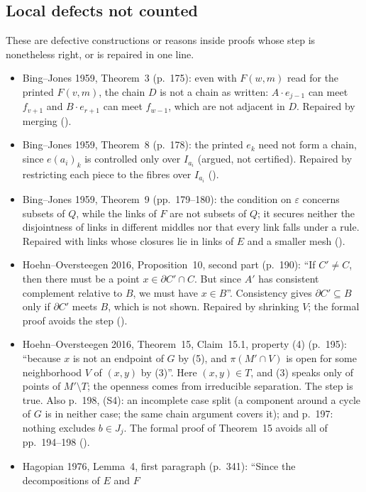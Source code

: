 \documentclass[11pt]{article}
\newcounter{defect}
\begin{document}
\subsection*{Local defects not counted}
These are defective constructions or reasons inside proofs whose step is nonetheless right, or is
repaired in one line.
\begin{itemize}
\item Bing--Jones 1959, Theorem~3 (p.~175): even with $F(w,m)$ read for the printed $F(v,m)$, the
  chain $D$ is not a chain as written: $A\cdot e_{j-1}$ can meet $f_{v+1}$ and $B\cdot e_{r+1}$ can
  meet $f_{w-1}$, which are not adjacent in $D$. Repaired by merging ().
\item Bing--Jones 1959, Theorem~8 (p.~178): the printed $e_k$ need not form a chain, since
  $e(a_i)_k$ is controlled only over $I_{a_i}$ (argued, not certified). Repaired by restricting each
  piece to the fibres over $I_{a_i}$ ().
\item Bing--Jones 1959, Theorem~9 (pp.~179--180): the condition on $\varepsilon$ concerns subsets
  of $Q$, while the links of $F$ are not subsets of $Q$; it secures neither the disjointness of
  links in different middles nor that every link falls under a rule. Repaired with links whose
  closures lie in links of $E$ and a smaller mesh ().
\item Hoehn--Oversteegen 2016, Proposition~10, second part (p.~190): ``If $C'\neq C$, then there
  must be a point $x\in\partial C'\cap C$. But since $A'$ has consistent complement relative to $B$,
  we must have $x\in B$''. Consistency gives $\partial C'\subseteq B$ only if $\partial C'$ meets
  $B$, which is not shown. Repaired by shrinking $V$; the formal proof avoids the step
  ().
\item Hoehn--Oversteegen 2016, Theorem~15, Claim~15.1, property (4) (p.~195): ``because $x$ is not an endpoint
  of $G$ by (5), and $\pi(M'\cap V)$ is open for some neighborhood $V$ of $(x,y)$ by (3)''. Here
  $(x,y)\in T$, and (3) speaks only of points of $M'\setminus T$; the openness comes from
  irreducible separation. The step is true. Also p.~198, (S4): an incomplete case split (a
  component around a cycle of $G$ is in neither case; the same chain argument covers it); and
  p.~197: nothing excludes $b\in J_j$. The formal proof of Theorem~15 avoids all of pp.~194--198
  ().
\item Hagopian 1976, Lemma~4, first paragraph (p.~341): ``Since the decompositions of $E$ and $F$

\end{itemize}
\end{document}
